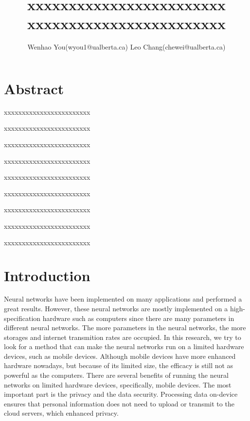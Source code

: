 \documentclass[UTF8]{article}
\title{xxxxxxxxxxxxxxxxxxxxxxxx xxxxxxxxxxxxxxxxxxxxxxxx}
\author{Wenhao You(wyou1@ualberta.ca) Leo Chang(chewei@ualberta.ca)}
\date{}
\begin{document}
	\maketitle
	
	
	
	
	
	
	\section*{Abstract}
	
	xxxxxxxxxxxxxxxxxxxxxxxx
	
	xxxxxxxxxxxxxxxxxxxxxxxx
	
	xxxxxxxxxxxxxxxxxxxxxxxx
	
	xxxxxxxxxxxxxxxxxxxxxxxx
	
	xxxxxxxxxxxxxxxxxxxxxxxx
	
	xxxxxxxxxxxxxxxxxxxxxxxx
	
	xxxxxxxxxxxxxxxxxxxxxxxx
	
	xxxxxxxxxxxxxxxxxxxxxxxx
	
	xxxxxxxxxxxxxxxxxxxxxxxx
	
	\section*{Introduction}
	
Neural networks have been implemented on many applications and performed a great results. However, these neural networks are mostly implemented on a high-specification hardware such as computers since there are many parameters in different neural networks. The more parameters in the neural networks, the more storages and internet transmition rates are occupied. In this research, we try to look for a method that can make the neural networks run on a limited hardware devices, such as mobile devices. Although mobile devices have more enhanced hardware nowadays, but because of its limited size, the efficacy is still not as powerful as the computers. There are several benefits of running the neural networks on limited hardware devices, specifically, mobile devices. The most important part is the privacy and the data security. Processing data on-device ensures that personal information does not need to upload or transmit to the cloud servers, which enhanced privacy. 
\end{document}
